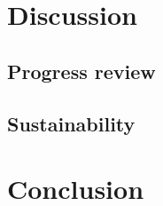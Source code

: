 \section{Discussion}
\label{sec:discussion}

\subsection{Progress review}
\label{sec:progress}

\subsection{Sustainability}
\label{sec:sustainability}

\section{Conclusion}